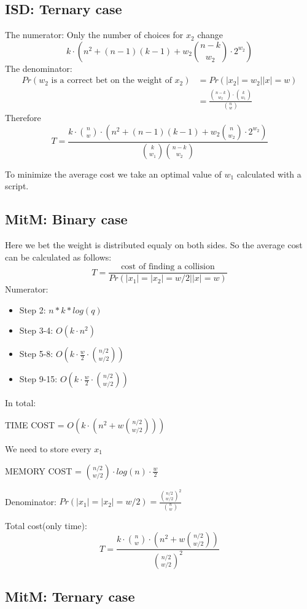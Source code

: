 \documentclass[12pt]{article}
\begin{document}
\subsection{ISD: Ternary case}
The numerator:
Only the number of choices for $x_2$ change
\[
    k\cdot(n^2 + (n-1)(k-1) + w_2\binom{n-k}{w_2}\cdot2^{w_2})
\]
The denominator:
\[
\begin{split}
    Pr(w_2\text{ is a correct bet on the weight of }x_2) & = Pr(|x_2| = w_2||x| = w) \\
    & = \frac{\binom{n-k}{w_2} \cdot \binom{k}{w_1}}{\binom{n}{w}}
\end{split}
\]
Therefore
\[
T = \frac{k\cdot\binom{n}{w}\cdot(n^2 + (n-1)(k-1) + w_2\binom{n}{w_2}\cdot2^{w_2})}{\binom{k}{w_1}\binom{n-k}{w_2}}
\]

To minimize the average cost we take an optimal value of $w_1$ calculated with a script.

\subsection{MitM: Binary case}


Here we bet the weight is distributed equaly on both sides. So the average cost can be calculated as follows:
\[
  T = \frac{\text{cost of finding a collision}}{Pr(|x_1| = |x_2| = w/2| |x| =w)}
\]
Numerator:
\begin{itemize}
    \item Step 2: $n*k*log(q)$
    \item Step 3-4: $O(k \cdot n^2)$
    \item Step 5-8: $O(k \cdot \frac{w}{2} \cdot \binom{n/2}{w/2})$
    \item Step 9-15: $O(k \cdot \frac{w}{2} \cdot \binom{n/2}{w/2})$
\end{itemize}

In total:

TIME COST = $O(k \cdot (n^2 + w\binom{n/2}{w/2}))$

We need to store every $x_1$


MEMORY COST = $\binom{n/2}{w/2} \cdot log(n) \cdot \frac{w}{2}$

Denominator:
$Pr(|x_1| = |x_2| = w/2) = \frac{\binom{n/2}{w/2}^{2}}{\binom{n}{w}}$

Total cost(only time):
\[
  T = \frac{k \cdot \binom{n}{w} \cdot (n^2 + w\binom{n/2}{w/2})}{\binom{n/2}{w/2}^2}
\]

\subsection{MitM: Ternary case}
\end{document}
